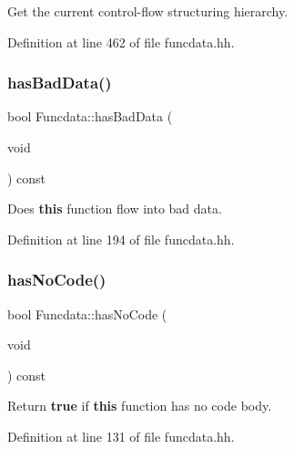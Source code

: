 Get the current control-\/flow structuring hierarchy. 



Definition at line 462 of file funcdata.\+hh.

\mbox{\label{class_funcdata_a4d1556d4d7cd4c30e0f8b009fc90a50e}} 
\subsubsection{\texorpdfstring{hasBadData()}{hasBadData()}}
{\footnotesize\ttfamily bool Funcdata\+::has\+Bad\+Data (\begin{DoxyParamCaption}\item[{void}]{ }\end{DoxyParamCaption}) const\hspace{0.3cm}{\ttfamily [inline]}}



Does {\bfseries{this}} function flow into bad data. 



Definition at line 194 of file funcdata.\+hh.

\mbox{\label{class_funcdata_aca7d46a9a41bb6057d2ad5334103ebb9}} 
\subsubsection{\texorpdfstring{hasNoCode()}{hasNoCode()}}
{\footnotesize\ttfamily bool Funcdata\+::has\+No\+Code (\begin{DoxyParamCaption}\item[{void}]{ }\end{DoxyParamCaption}) const\hspace{0.3cm}{\ttfamily [inline]}}



Return {\bfseries{true}} if {\bfseries{this}} function has no code body. 



Definition at line 131 of file funcdata.\+hh.

